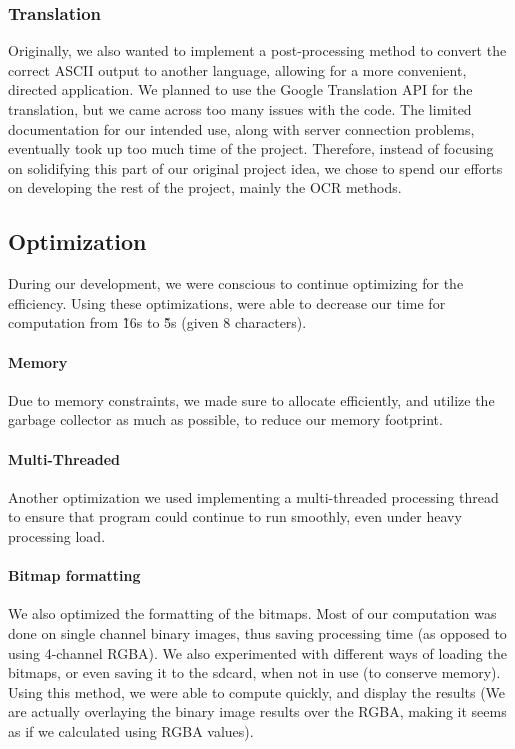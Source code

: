 \subsubsection{Translation}
Originally, we also wanted to implement a 
post-processing method to convert the correct 
ASCII output to another language, allowing for a 
more convenient, directed application. We planned to 
use the Google Translation API for the translation, but 
we came across too many issues with the code. The limited 
documentation for our intended use, along with server connection 
problems, eventually took up too much time of the project. 
Therefore, instead of focusing on solidifying this part of our 
original project idea, we chose to spend our efforts on developing 
the rest of the project, mainly the OCR methods.

\subsection{Optimization}
During our development, we were conscious to continue optimizing for the efficiency. Using these optimizations, were able
to decrease our time for computation from \~16s to \~5s (given 8 characters).
\paragraph{Memory} Due to memory constraints, we 
made sure to allocate efficiently, and utilize the garbage collector as much as possible, to reduce our memory footprint.
\paragraph{Multi-Threaded} Another optimization we used implementing a multi-threaded processing thread to ensure that program could continue
to run smoothly, even under heavy processing load. 
\paragraph{Bitmap formatting} We also optimized the formatting of the bitmaps. Most of our computation was done on single channel binary
images, thus saving processing time (as opposed to using 4-channel RGBA). We also experimented with different ways of loading
the bitmaps, or even saving it to the sdcard, when not in use (to conserve memory). Using this method, we were able to compute quickly,
and display the results (We are actually overlaying the binary image results over the RGBA, making it seems as if we calculated using RGBA values).
